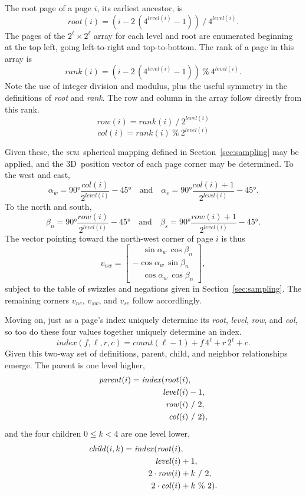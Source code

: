 \documentclass[oneside,10pt]{memoir}
\newcommand{\threed}  {3D}
\newcommand{\scm}     {\textsc{scm}}
\newcommand{\scmcount} [1]{\ensuremath{\mathit{count}(#1)}}
\newcommand{\scmlevel} [1]{\ensuremath{\mathit{level}(#1)}}
\newcommand{\scmroot}  [1]{\ensuremath{\mathit{root}(#1)}}
\newcommand{\scmrank}  [1]{\ensuremath{\mathit{rank}(#1)}}
\newcommand{\scmrow}   [1]{\ensuremath{\mathit{row}(#1)}}
\newcommand{\scmcol}   [1]{\ensuremath{\mathit{col}(#1)}}
\newcommand{\scmindex} [1]{\ensuremath{\mathit{index}(#1)}}
\newcommand{\scmparent}[1]{\ensuremath{\mathit{parent}(#1)}}
\newcommand{\scmchild} [1]{\ensuremath{\mathit{child}(#1)}}
\begin{document}
\begin{Spacing}{1.1}
The root page of a page $i$, its earliest ancestor, is
\[\scmroot{i}=(i-2\,(4^{\scmlevel{i}}-1))\ /\ 4^{\scmlevel{i}}.\]
The pages of the $2^\ell\times 2^\ell$ array for each level and root are enumerated beginning at the top left, going left-to-right and top-to-bottom. The rank of a page in this array is
\[\scmrank{i}=(i-2\,(4^{\scmlevel{i}}-1))\ \%\ 4^{\scmlevel{i}}.\]
Note the use of integer division and modulus, plus the useful symmetry in the definitions of \textit{root} and \textit{rank}. The row and column in the array follow directly from this rank.
\[\scmrow{i}=\scmrank{i}\ /\ 2^{\scmlevel{i}}\]
\[\scmcol{i}=\scmrank{i}\ \%\ 2^{\scmlevel{i}}\]

Given these, the \scm\ spherical mapping defined in Section~\ref{sec:sampling} may be applied, and the \threed\ position vector of each page corner may be determined. To the west and east,
\[\alpha_w=\ang{90}\frac{col(i)}{2^{\scmlevel{i}}}-\ang{45}\quad\textrm{and}\quad
  \alpha_e=\ang{90}\frac{col(i)+1}{2^{\scmlevel{i}}}-\ang{45}.\]
To the north and south,
\[\beta_n=\ang{90}\frac{row(i)}{2^{\scmlevel{i}}}-\ang{45}\quad\textrm{and}\quad
  \beta_s=\ang{90}\frac{row(i)+1}{2^{\scmlevel{i}}}-\ang{45}.\]
The vector pointing toward the north-west corner of page $i$ is thus
\[v_{nw}=\left[\begin{array}{c}
\phantom{-}\sin\alpha_w\, \cos\beta_n\\
        {-}\cos\alpha_w\, \sin\beta_n\\
\phantom{-}\cos\alpha_w\, \cos\beta_n
\end{array}\right],\]
subject to the table of swizzles and negations given in Section~\ref{sec:sampling}. The remaining corners $v_{ne}$, $v_{sw}$, and $v_{se}$ follow accordlingly.

Moving on, just as a page's index uniquely determine its \textit{root}, \textit{level}, \textit{row}, and \textit{col}, so too do these four values together uniquely determine an index.
\[\scmindex{f, \ell, r, c}=\scmcount{\ell-1}+f\,4^\ell+r\,2^\ell+c.\]
Given this two-way set of definitions, parent, child, and neighbor relationships emerge. The parent is one level higher,
\begin{align*}
\scmparent{i}=\scmindex{\scmroot{i}&,\\
                        \scmlevel{i}&-1,\\
                        \scmrow{i}&\ /\ 2,\\
                        \scmcol{i}&\ /\ 2},
\end{align*}
and the four children $0\leq k < 4$ are one level lower,
\begin{align*}
\scmchild{i,k}=\scmindex{\scmroot{i}&,\\
                        \scmlevel{i}&+1,\\
                    2\cdot\scmrow{i}&+k\ /\ 2,\\
                    2\cdot\scmcol{i}&+k\ \%\ 2}.
\end{align*}


\end{Spacing}
\end{document}
